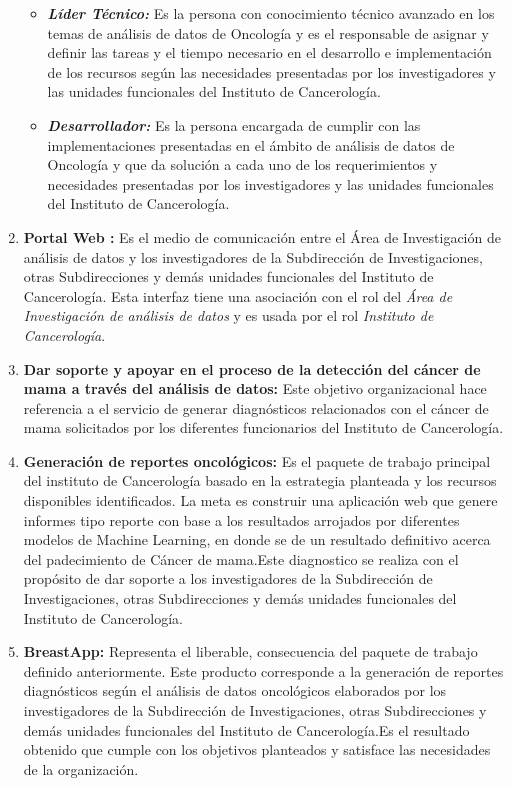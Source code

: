 \begin{enumerate}[label=\textbf{\arabic*})]
\begin{itemize}
\item  \textbf{\textit{Líder Técnico:}}
Es la persona con conocimiento técnico avanzado en los temas de análisis de datos de Oncología y es el  responsable de asignar y definir las  tareas y el tiempo necesario en el desarrollo e implementación de los recursos  según las necesidades presentadas por los investigadores y las unidades funcionales del Instituto  de Cancerología.

\item  \textbf{\textit{Desarrollador:}}
Es la persona encargada de cumplir con las implementaciones presentadas en el ámbito de análisis de datos de Oncología y que da  solución a cada uno de los requerimientos y necesidades presentadas por los  investigadores y las unidades funcionales del Instituto  de Cancerología.
\end{itemize}

\item  \textbf{Portal Web :} Es el medio de comunicación entre el Área de Investigación de análisis de datos  y los investigadores de la Subdirección de Investigaciones, otras Subdirecciones y demás unidades funcionales del Instituto  de Cancerología. Esta interfaz tiene una asociación con el rol del  \textit{Área de Investigación de análisis de datos}  y es usada por el rol \textit{Instituto  de Cancerología}.


\item  \textbf{Dar soporte y apoyar en el proceso de la detección del cáncer de mama a través del análisis de datos:} Este objetivo organizacional hace referencia a el servicio de generar diagnósticos relacionados con el cáncer de mama  solicitados por los diferentes funcionarios del Instituto de Cancerología.

\item  \textbf{Generación de reportes oncológicos:} Es el paquete de trabajo principal del instituto de Cancerología basado en la estrategia planteada y los recursos disponibles identificados. La meta es construir una  aplicación web que genere  informes tipo reporte con base a los resultados arrojados por  diferentes modelos de Machine Learning, en donde se de un resultado definitivo acerca del  padecimiento de Cáncer de mama.Este diagnostico se realiza con el propósito de dar soporte a los investigadores de la Subdirección de Investigaciones, otras Subdirecciones y demás unidades funcionales del Instituto  de Cancerología.

\item  \textbf{BreastApp:} Representa el liberable, consecuencia del paquete de
trabajo definido anteriormente. Este producto corresponde a la generación de reportes diagnósticos según el análisis de datos oncológicos elaborados por los investigadores de la Subdirección de Investigaciones, otras Subdirecciones y demás unidades funcionales del Instituto  de Cancerología.Es el resultado obtenido que cumple con los objetivos planteados y satisface las necesidades de la organización.
\end{enumerate}

